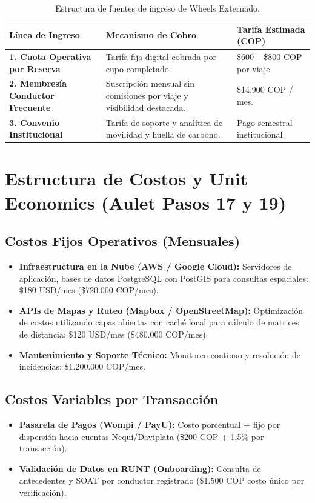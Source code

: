 \documentclass[11pt,a4paper]{article}
\begin{document}
\begin{table}[ht!]
\centering
\small
\begin{tabularx}{\textwidth}{p{4.2cm} X p{3.8cm}}
\toprule
\textbf{L\'inea de Ingreso} & \textbf{Mecanismo de Cobro} & \textbf{Tarifa Estimada (COP)} \\
\midrule
\textbf{1. Cuota Operativa por Reserva} & Tarifa fija digital cobrada por cupo completado. & \$600 -- \$800 COP por viaje. \\
\addlinespace
\textbf{2. Membres\'ia Conductor Frecuente} & Suscripci\'on mensual sin comisiones por viaje y visibilidad destacada. & \$14.900 COP / mes. \\
\addlinespace
\textbf{3. Convenio Institucional} & Tarifa de soporte y anal\'itica de movilidad y huella de carbono. & Pago semestral institucional. \\
\bottomrule
\end{tabularx}
\caption{Estructura de fuentes de ingreso de Wheels Externado.}
\end{table}

\section{Estructura de Costos y Unit Economics (Aulet Pasos 17 y 19)}

\subsection{Costos Fijos Operativos (Mensuales)}
\begin{itemize}[leftmargin=*]
    \item \textbf{Infraestructura en la Nube (AWS / Google Cloud):} Servidores de aplicaci\'on, bases de datos PostgreSQL con PostGIS para consultas espaciales: \$180 USD/mes (\$720.000 COP/mes).
    \item \textbf{APIs de Mapas y Ruteo (Mapbox / OpenStreetMap):} Optimizaci\'on de costos utilizando capas abiertas con cach\'e local para c\'alculo de matrices de distancia: \$120 USD/mes (\$480.000 COP/mes).
    \item \textbf{Mantenimiento y Soporte T\'ecnico:} Monitoreo continuo y resoluci\'on de incidencias: \$1.200.000 COP/mes.
\end{itemize}

\subsection{Costos Variables por Transacci\'on}
\begin{itemize}[leftmargin=*]
    \item \textbf{Pasarela de Pagos (Wompi / PayU):} Costo porcentual + fijo por dispersi\'on hacia cuentas Nequi/Daviplata (\$200 COP + 1,5\% por transacci\'on).
    \item \textbf{Validaci\'on de Datos en RUNT (Onboarding):} Consulta de antecedentes y SOAT por conductor registrado (\$1.500 COP costo \'unico por verificaci\'on).
\end{itemize}
\end{document}
